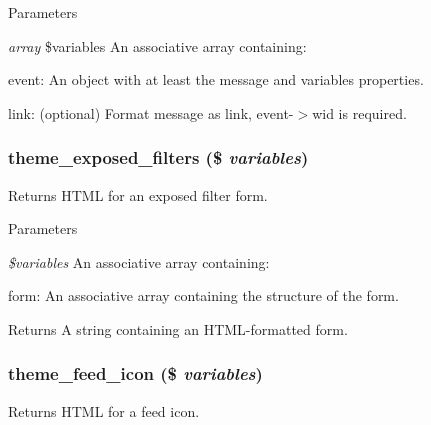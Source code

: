 \begin{DoxyParams}{Parameters}
\item[{\em array}]\$variables An associative array containing:
\begin{DoxyItemize}
\item event: An object with at least the message and variables properties.
\item link: (optional) Format message as link, event-\/$>$wid is required. 
\end{DoxyItemize}\end{DoxyParams}
\hypertarget{group__themeable_ga8750c0043fa9aecbe88594d8b018fa3c}{
\subsubsection[{theme\_\-exposed\_\-filters}]{\setlength{\rightskip}{0pt plus 5cm}theme\_\-exposed\_\-filters (\$ {\em variables})}}
\label{group__themeable_ga8750c0043fa9aecbe88594d8b018fa3c}
Returns HTML for an exposed filter form.


\begin{DoxyParams}{Parameters}
\item[{\em \$variables}]An associative array containing:
\begin{DoxyItemize}
\item form: An associative array containing the structure of the form.
\end{DoxyItemize}\end{DoxyParams}
\begin{DoxyReturn}{Returns}
A string containing an HTML-\/formatted form. 
\end{DoxyReturn}
\hypertarget{group__themeable_gaf7ed9df27bf344443ce927e3650adfbd}{
\subsubsection[{theme\_\-feed\_\-icon}]{\setlength{\rightskip}{0pt plus 5cm}theme\_\-feed\_\-icon (\$ {\em variables})}}
\label{group__themeable_gaf7ed9df27bf344443ce927e3650adfbd}
Returns HTML for a feed icon.


